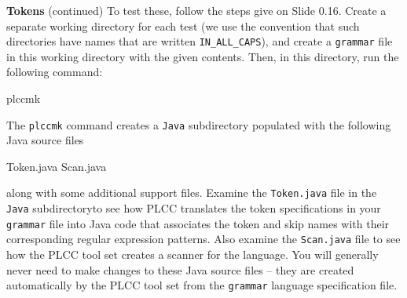 \begin{minipage}[t]{\sw}
\slidenumber
\LARGE
{\bf Tokens} (continued)\exx
To test these, follow the steps give on Slide 0.16.
Create a separate working directory for each test
(we use the convention that such directories have names
that are written \verb'IN_ALL_CAPS'),
and create a \verb'grammar' file in this working directory
with the given contents.
Then, in this directory, run the following command:
\begin{qv}
plccmk
\end{qv}
The \verb'plccmk' command
creates a \verb'Java' subdirectory
populated with the following Java source files
{\Large
\begin{qv}
Token.java
Scan.java
\end{qv}
}
along with some additional support files.\exx
Examine the \verb'Token.java' file
in the \verb'Java' subdirectoryto see
how PLCC translates the token specifications in your \verb'grammar' file
into Java code that associates the token and skip names
with their corresponding regular expression patterns.\exx
Also examine the \verb'Scan.java' file
to see how the PLCC tool set creates a scanner for the language.
You will generally never need to make changes
to these Java source files --
they are created automatically by the PLCC tool set
from the \verb'grammar' language specification file.
\end{minipage}
\clearpage
